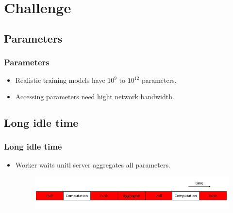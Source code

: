 \section{Challenge}

\subsection{Parameters}
\begin{frame}
    \frametitle{Parameters}
	\begin{itemize}
		\item Realistic training models have $10^{9}$ to $10^{12}$ parameters.
		\item Accessing parameters need hight network bandwidth. 
	\end{itemize}
\end{frame}

\subsection{Long idle time}
\begin{frame}
    \frametitle{Long idle time}
	\begin{itemize}
		\item Worker waits unitl server aggregates all parameters.
    	\begin{figure}
			\includegraphics[scale=0.4]{figure/time.png}
		\end{figure}
	\end{itemize}
\end{frame}



